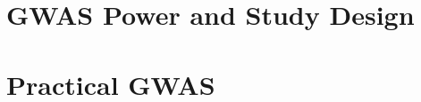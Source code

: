 \documentclass{pset}
\begin{document}
\subsection{}

\subsection{}

\subsection{}

\section{GWAS Power and Study Design}

\subsection{}

\subsection{}

\subsection{\bLozenge\bLozenge\bLozenge}

\section{Practical GWAS}

\subsection{}

\subsection{}

\subsection{}
\end{document}
